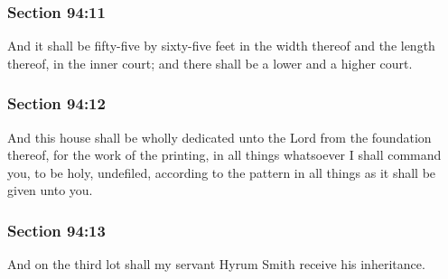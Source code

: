 	\subsubsection{Section 94:11} %
		\label{DC94-11}

		And it shall be fifty-five by sixty-five feet in the width thereof and the length thereof, in the inner court; and there shall be a lower and a higher court.


	\subsubsection{Section 94:12} %
		\label{DC94-12}

		And this house shall be wholly dedicated unto the Lord from the foundation thereof, for the work of the printing, in all things whatsoever I shall command you, to be holy, undefiled, according to the pattern in all things as it shall be given unto you.


	\subsubsection{Section 94:13} %
		\label{DC94-13}

		And on the third lot shall my servant Hyrum Smith receive his inheritance.


